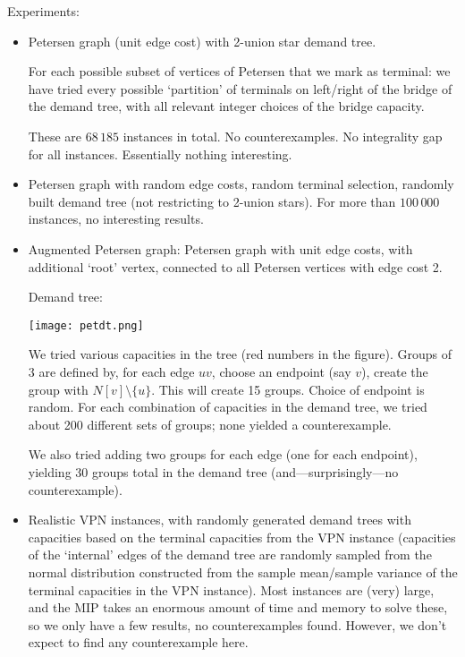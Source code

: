 \documentclass[11pt]{article}
\begin{document}
    \noindent%
    Experiments:
    \begin{itemize}
        \item Petersen graph (unit edge cost) with 2-union star demand tree.

        For each possible subset of vertices of Petersen that we mark as terminal:
        we have tried every possible `partition' of terminals on left/right of the bridge of the demand tree, with all relevant integer choices of the bridge capacity.

        These are $68\,185$ instances in total.
        No counterexamples.
        No integrality gap for all instances.
        Essentially nothing interesting.

        \item
        Petersen graph with random edge costs, random terminal selection, randomly built demand tree (not restricting to 2-union stars).
        For more than $100\,000$ instances, no interesting results.

        \item Augmented Petersen graph: Petersen graph with unit edge costs, with additional `root' vertex, connected to all Petersen vertices with edge cost 2.

        Demand tree:

        \texttt{[image: petdt.png]}

        We tried various capacities in the tree (red numbers in the figure).
        Groups of 3 are defined by, for each edge $uv$, choose an endpoint (say $v$), create the group with $N[v] \setminus \{ u \}$.
        This will create 15 groups.
        Choice of endpoint is random.
        For each combination of capacities in the demand tree, we tried about 200 different sets of groups;
        none yielded a counterexample.

        We also tried adding two groups for each edge (one for each endpoint), yielding 30 groups total in the demand tree (and---surprisingly---no counterexample).

        \item Realistic VPN instances, with randomly generated demand trees with capacities based on the terminal capacities from the VPN instance (capacities of the `internal' edges of the demand tree are randomly sampled from the normal distribution constructed from the sample mean/sample variance of the terminal capacities in the VPN instance).
        Most instances are (very) large, and the MIP takes an enormous amount of time and memory to solve these, so we only have a few results, no counterexamples found.
        However, we don't expect to find any counterexample here.


\end{itemize}
\end{document}
